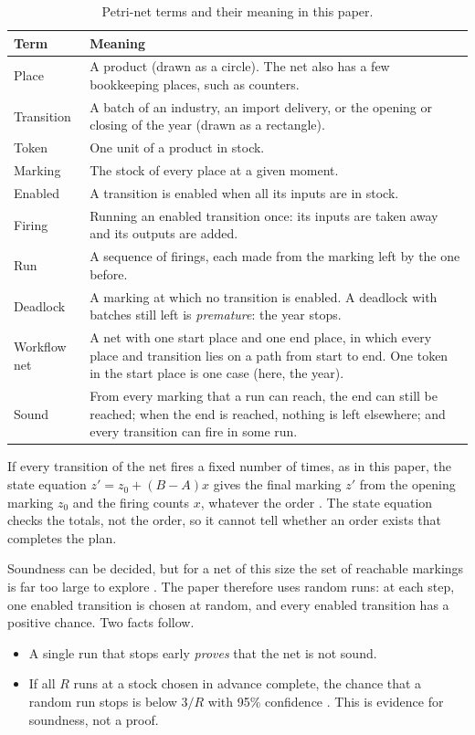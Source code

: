 \documentclass[11pt]{article}
\begin{document}
\begin{table}[htbp]
\centering\small
\caption{Petri-net terms and their meaning in this paper.}
\label{tab:terms}
\begin{tabularx}{\textwidth}{@{}lL@{}}
\toprule
Term & Meaning\\
\midrule
Place & A product (drawn as a circle). The net also has a few bookkeeping places, such as counters.\\
Transition & A batch of an industry, an import delivery, or the opening or closing of the year (drawn as a rectangle).\\
Token & One unit of a product in stock.\\
Marking & The stock of every place at a given moment.\\
Enabled & A transition is enabled when all its inputs are in stock.\\
Firing & Running an enabled transition once: its inputs are taken away and its outputs are added.\\
Run & A sequence of firings, each made from the marking left by the one before.\\
Deadlock & A marking at which no transition is enabled. A deadlock with batches still left is \emph{premature}: the year stops.\\
Workflow net & A net with one start place and one end place, in which every place and transition lies on a path from start to end. One token in the start place is one case (here, the year).\\
Sound & From every marking that a run can reach, the end can still be reached; when the end is reached, nothing is left elsewhere; and every transition can fire in some run.\\
\bottomrule
\end{tabularx}
\end{table}

If every transition of the net fires a fixed number of times, as in this paper, the state equation $z'=z_0+(B-A)x$ gives the final marking $z'$ from the opening marking $z_0$ and the firing counts $x$, whatever the order \citep{Bonanno1995}. The state equation checks the totals, not the order, so it cannot tell whether an order exists that completes the plan.

Soundness can be decided, but for a net of this size the set of reachable markings is far too large to explore \citep{vanderAalst2011}. The paper therefore uses random runs: at each step, one enabled transition is chosen at random, and every enabled transition has a positive chance. Two facts follow.
\begin{itemize}[leftmargin=*]
\item A single run that stops early \emph{proves} that the net is not sound.
\item If all $R$ runs at a stock chosen in advance complete, the chance that a random run stops is below $3/R$ with 95\% confidence \citep{HanleyLippmanHand1983}. This is evidence for soundness, not a proof.
\end{itemize}
\end{document}
